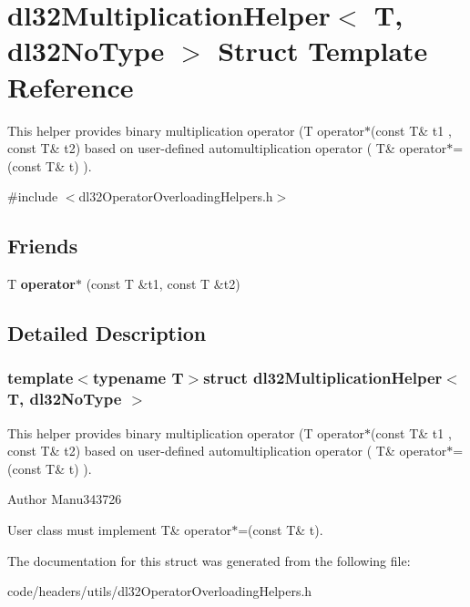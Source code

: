 \hypertarget{structdl32_multiplication_helper_3_01_t_00_01dl32_no_type_01_4}{\section{dl32\-Multiplication\-Helper$<$ T, dl32\-No\-Type $>$ Struct Template Reference}
\label{structdl32_multiplication_helper_3_01_t_00_01dl32_no_type_01_4}
}


This helper provides binary multiplication operator (T operator$\ast$(const T\& t1 , const T\& t2) based on user-\/defined automultiplication operator ( T\& operator$\ast$=(const T\& t) ).  




{\ttfamily \#include $<$dl32\-Operator\-Overloading\-Helpers.\-h$>$}

\subsection*{Friends}
\begin{DoxyCompactItemize}
\item 
\hypertarget{structdl32_multiplication_helper_3_01_t_00_01dl32_no_type_01_4_a98dda27f2d2bc8b998974510a64d585e}{T {\bfseries operator$\ast$} (const T \&t1, const T \&t2)}\label{structdl32_multiplication_helper_3_01_t_00_01dl32_no_type_01_4_a98dda27f2d2bc8b998974510a64d585e}

\end{DoxyCompactItemize}


\subsection{Detailed Description}
\subsubsection*{template$<$typename T$>$struct dl32\-Multiplication\-Helper$<$ T, dl32\-No\-Type $>$}

This helper provides binary multiplication operator (T operator$\ast$(const T\& t1 , const T\& t2) based on user-\/defined automultiplication operator ( T\& operator$\ast$=(const T\& t) ). 

\begin{DoxyAuthor}{Author}
Manu343726
\end{DoxyAuthor}
User class must implement T\& operator$\ast$=(const T\& t). 

The documentation for this struct was generated from the following file\-:\begin{DoxyCompactItemize}
\item 
code/headers/utils/dl32\-Operator\-Overloading\-Helpers.\-h\end{DoxyCompactItemize}
